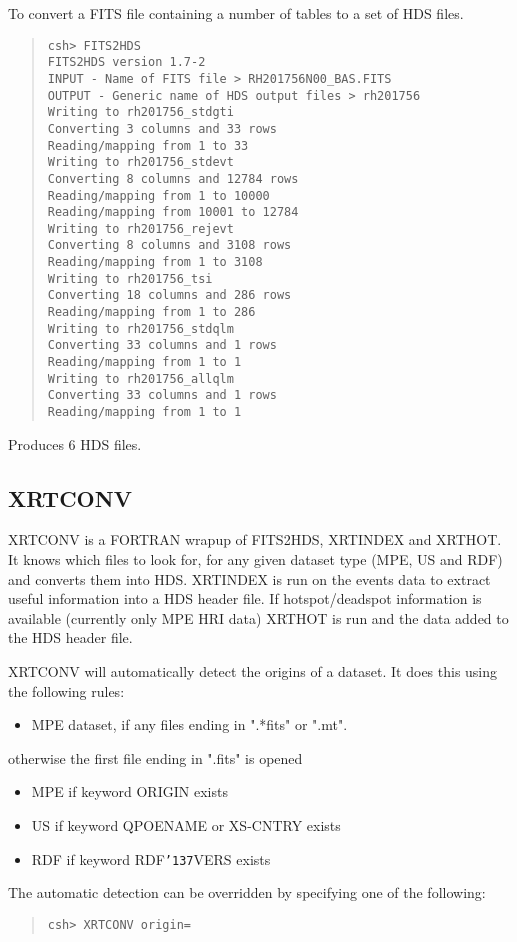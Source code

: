 \documentclass{book}
\renewcommand{\_}{{\tt\char'137}}     %
\begin{document}
To convert a FITS file containing a number of tables to a set of HDS
files.
\begin{quote}\begin{verbatim}
csh> FITS2HDS
FITS2HDS version 1.7-2
INPUT - Name of FITS file > RH201756N00_BAS.FITS
OUTPUT - Generic name of HDS output files > rh201756
Writing to rh201756_stdgti
Converting 3 columns and 33 rows
Reading/mapping from 1 to 33
Writing to rh201756_stdevt
Converting 8 columns and 12784 rows
Reading/mapping from 1 to 10000
Reading/mapping from 10001 to 12784
Writing to rh201756_rejevt
Converting 8 columns and 3108 rows
Reading/mapping from 1 to 3108
Writing to rh201756_tsi
Converting 18 columns and 286 rows
Reading/mapping from 1 to 286
Writing to rh201756_stdqlm
Converting 33 columns and 1 rows
Reading/mapping from 1 to 1
Writing to rh201756_allqlm
Converting 33 columns and 1 rows
Reading/mapping from 1 to 1
\end{verbatim}\end{quote}
Produces 6 HDS files.

\subsection{XRTCONV}
XRTCONV is a FORTRAN wrapup of FITS2HDS, XRTINDEX and XRTHOT. It
knows which files to look for, for any given dataset type (MPE, US and RDF)
and converts them into HDS. XRTINDEX is run on the events data to
extract useful information into a HDS header file. If hotspot/deadspot
information is available (currently only MPE HRI data) XRTHOT is run
and the data added to the HDS header file.

XRTCONV will automatically detect the origins of a dataset. It does this
using the following rules:
\begin{itemize}
\item MPE dataset, if any files ending in ".*fits" or ".mt".
\end{itemize}
otherwise the first file ending in ".fits" is opened
\begin{itemize}
\item MPE if keyword ORIGIN exists
\item US if keyword QPOENAME or XS-CNTRY exists
\item RDF if keyword RDF\_VERS exists
\end{itemize}
The automatic detection can be overridden by specifying one of the
following:

\begin{quote}\begin{verbatim}
csh> XRTCONV origin=
\end{verbatim}\end{quote}
\end{document}
